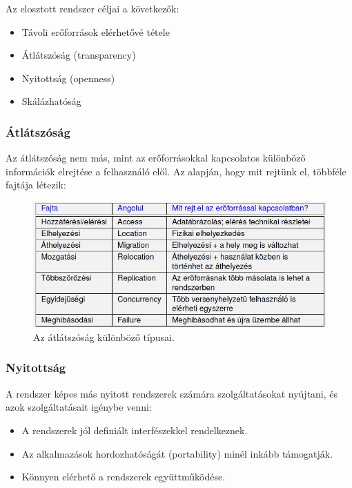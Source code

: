 \documentclass[margin=0px]{article}
\begin{document}
	Az elosztott rendszer céljai a következők:
	
	\begin{itemize}
		\item	Távoli erőforrások elérhetővé tétele

		\item	Átlátszóság (transparency)
		
		\item	Nyitottság (openness)
		
		\item	Skálázhatóság
	\end{itemize}
	
	\subsubsection{Átlátszóság}
	
	Az átlátszóság nem más, mint az erőforrásokkal kapcsolatos különböző információk elrejtése a felhasználó elől.
	Az alapján, hogy mit rejtünk el, többféle fajtája létezik:
	
	\begin{figure}[H]
		\centering
		\includegraphics[width=0.8\linewidth]{img/atlatszosag}
		\caption{Az átlátszóság különböző típusai.}
		\label{fig:atlatszosag}
	\end{figure}
	
	\subsubsection{Nyitottság}
	
	A rendszer képes más nyitott rendszerek számára szolgáltatásokat nyújtani, és azok szolgáltatásait igénybe venni:
	
	\begin{itemize}
		\item	A rendszerek jól definiált interfészekkel rendelkeznek.
		\item	Az alkalmazások hordozhatóságát (portability) minél inkább támogatják.
		\item	Könnyen elérhető a rendszerek együttműködése.
	\end{itemize}
	
\end{document}
